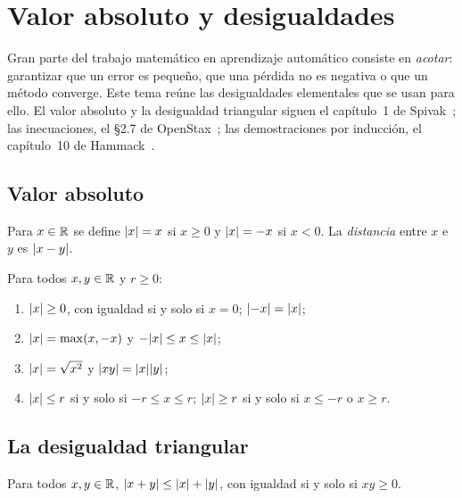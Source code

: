 \chapter{Valor absoluto y desigualdades}
\label{tema:2}

Gran parte del trabajo matemático en aprendizaje automático consiste en \emph{acotar}: garantizar que un error es pequeño, que una pérdida no es negativa o que un método converge. Este tema reúne las desigualdades elementales que se usan para ello. El valor absoluto y la desigualdad triangular siguen el capítulo~1 de Spivak~\cite{spivak}; las inecuaciones, el §2.7 de OpenStax~\cite{openstax}; las demostraciones por inducción, el capítulo~10 de Hammack~\cite{hammack}.

\section{Valor absoluto}

\begin{definicion}\label{def:abs}
Para $x\in\mathbb{R}$ se define $\lvert x\rvert=x$ si $x\ge 0$ y $\lvert x\rvert=-x$ si $x<0$. La \emph{distancia} entre $x$ e $y$ es $\lvert x-y\rvert$.
\end{definicion}

\begin{proposicion}\label{prop:abs}
Para todos $x,y\in\mathbb{R}$ y $r\ge 0$:
\begin{enumerate}
  \item $\lvert x\rvert\ge 0$, con igualdad si y solo si $x=0$; $\lvert-x\rvert=\lvert x\rvert$;
  \item $\lvert x\rvert=\max(x,-x)$ y $-\lvert x\rvert\le x\le\lvert x\rvert$;
  \item $\lvert x\rvert=\sqrt{x^2}$ y $\lvert xy\rvert=\lvert x\rvert\lvert y\rvert$;
  \item $\lvert x\rvert\le r$ si y solo si $-r\le x\le r$; $\lvert x\rvert\ge r$ si y solo si $x\le -r$ o $x\ge r$.
\end{enumerate}
\end{proposicion}

\section{La desigualdad triangular}

\begin{teorema}\label{teo:triangular}
Para todos $x,y\in\mathbb{R}$, $\lvert x+y\rvert\le\lvert x\rvert+\lvert y\rvert$, con igualdad si y solo si $xy\ge0$.
\end{teorema}

